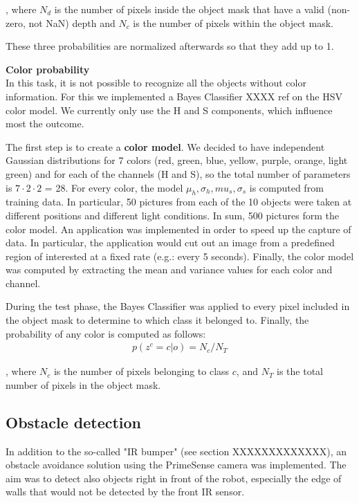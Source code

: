 , where $N_d$ is the number of pixels inside the object mask that have a valid (non-zero, not NaN) depth and $N_c$ is the number of pixels within the object mask.

These three probabilities are normalized afterwards so that they add up to 1.

\textbf{Color probability}\\
In this task, it is not possible to recognize all the objects without color information. For this we implemented a Bayes Classifier XXXX ref on the HSV color model. We currently only use the H and S components, which influence most the outcome. 

The first step is to create a \textbf{color model}. We decided to have independent Gaussian distributions for 7 colors (red, green, blue, yellow, purple, orange, light green) and for each of the channels (H and S), so the total number of parameters is $7 \cdot 2 \cdot 2$ = 28. For every color, the model ${\mu_h, \sigma_h, mu_s, \sigma_s}$ is computed from training data. In particular, 50 pictures from each of the 10 objects were taken at different positions and different light conditions. In sum, 500 pictures form the color model. An application was implemented in order to speed up the capture of data. In particular, the application would cut out an image from a predefined region of interested at a fixed rate (e.g.: every 5 seconds). Finally, the color model was computed by extracting the mean and variance values for each color and channel.

During the test phase, the Bayes Classifier was applied to every pixel included in the object mask to determine to which class it belonged to. Finally, the probability of any color is computed as follows:
\begin{align}
p(z^c = c | o ) = N_c / N_T
\end{align}

, where $N_c$ is the number of pixels belonging to class $c$, and $N_T$ is the total number of pixels in the object mask. 

\subsection{Obstacle detection}

In addition to the so-called "IR bumper" (see section XXXXXXXXXXXXX), an obstacle avoidance solution using the PrimeSense camera was implemented. The aim was to detect also objects right in front of the robot, especially the edge of walls that would not be detected by the front IR sensor.

